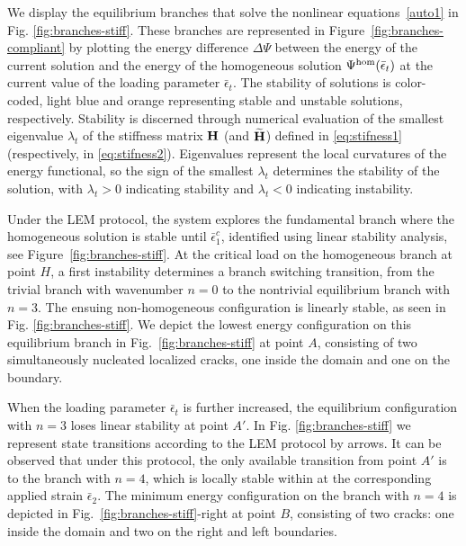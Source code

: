 \documentclass[10pt]{article}
\begin{document}
We display the equilibrium branches that solve the nonlinear equations~\ref{auto1} in Fig. \ref{fig:branches-stiff}. These branches are represented in Figure~\ref{fig:branches-compliant} by plotting the energy difference $\Delta \Psi$ between the energy of the current solution and the energy of the homogeneous solution $\Psi^\text{hom}(\bar{\epsilon}_t)$ at the current value of the loading parameter $\bar\epsilon_t$. The stability of solutions is color-coded, light blue and orange representing stable and unstable solutions, respectively. Stability is discerned through numerical evaluation of the smallest eigenvalue $\lambda_t$ of the stiffness matrix $\mathbf{H}$ (and $\widetilde{\mathbf{H}}$) defined in \eqref{eq:stifness1} (respectively, in \eqref{eq:stifness2}). Eigenvalues represent the local curvatures of the energy functional, so the sign of the smallest  $\lambda_t$ determines the stability of the solution, with $\lambda_t > 0$ indicating stability and $\lambda_t < 0$ indicating instability.


Under the LEM protocol, the system explores the fundamental branch where the homogeneous solution is stable until 
$\bar\epsilon^c_1$, identified using linear stability analysis, see Figure~\ref{fig:branches-stiff}. At the critical load on the homogeneous branch  at point $H$, a first instability determines a branch switching transition, from the trivial branch with wavenumber $n = 0$ to the nontrivial equilibrium branch with $n = 3$. The ensuing non-homogeneous configuration is linearly stable, as seen in Fig. \ref{fig:branches-stiff}. We depict the lowest energy configuration on this equilibrium branch in Fig.~\ref{fig:branches-stiff} at point $A$, consisting of two simultaneously nucleated localized cracks, one inside the domain and one on the boundary. 

When the loading parameter $\bar{\epsilon}_t$ is further increased, the equilibrium configuration with $n=3$ loses linear stability at point $A'$. In Fig. \ref{fig:branches-stiff} we represent state transitions according to the LEM protocol by arrows. It can be observed that under this protocol, the only available transition from point $A'$ is to the branch with $n=4$, which is locally stable within at the corresponding applied strain $\bar{\epsilon}_2$. The minimum energy configuration on the branch with $n=4$ is depicted in Fig.~\ref{fig:branches-stiff}-right at point $B$, consisting of two cracks: one inside the domain and two on the right and left boundaries.
\end{document}
